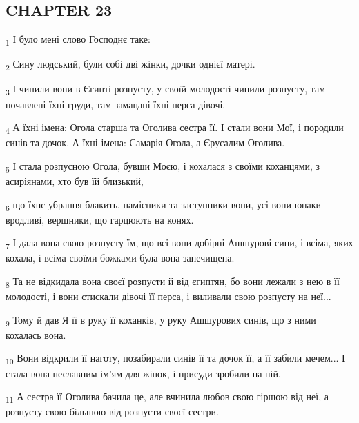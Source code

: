 \subsection{CHAPTER 23}
\begin{tcolorbox}
\textsubscript{1} І було мені слово Господнє таке:
\end{tcolorbox}
\begin{tcolorbox}
\textsubscript{2} Сину людський, були собі дві жінки, дочки однієї матері.
\end{tcolorbox}
\begin{tcolorbox}
\textsubscript{3} І чинили вони в Єгипті розпусту, у своїй молодості чинили розпусту, там почавлені їхні груди, там замацані їхні перса дівочі.
\end{tcolorbox}
\begin{tcolorbox}
\textsubscript{4} А їхні імена: Огола старша та Оголива сестра її. І стали вони Мої, і породили синів та дочок. А їхні імена: Самарія Огола, а Єрусалим Оголива.
\end{tcolorbox}
\begin{tcolorbox}
\textsubscript{5} І стала розпусною Огола, бувши Моєю, і кохалася з своїми коханцями, з асиріянами, хто був їй близький,
\end{tcolorbox}
\begin{tcolorbox}
\textsubscript{6} що їхнє убрання блакить, намісники та заступники вони, усі вони юнаки вродливі, вершники, що гарцюють на конях.
\end{tcolorbox}
\begin{tcolorbox}
\textsubscript{7} І дала вона свою розпусту їм, що всі вони добірні Ашшурові сини, і всіма, яких кохала, і всіма своїми божками була вона занечищена.
\end{tcolorbox}
\begin{tcolorbox}
\textsubscript{8} Та не відкидала вона своєї розпусти й від єгиптян, бо вони лежали з нею в її молодості, і вони стискали дівочі її перса, і виливали свою розпусту на неї...
\end{tcolorbox}
\begin{tcolorbox}
\textsubscript{9} Тому й дав Я її в руку її коханків, у руку Ашшурових синів, що з ними кохалась вона.
\end{tcolorbox}
\begin{tcolorbox}
\textsubscript{10} Вони відкрили її наготу, позабирали синів її та дочок її, а її забили мечем... І стала вона неславним ім'ям для жінок, і присуди зробили на ній.
\end{tcolorbox}
\begin{tcolorbox}
\textsubscript{11} А сестра її Оголива бачила це, але вчинила любов свою гіршою від неї, а розпусту свою більшою від розпусти своєї сестри.
\end{tcolorbox}
